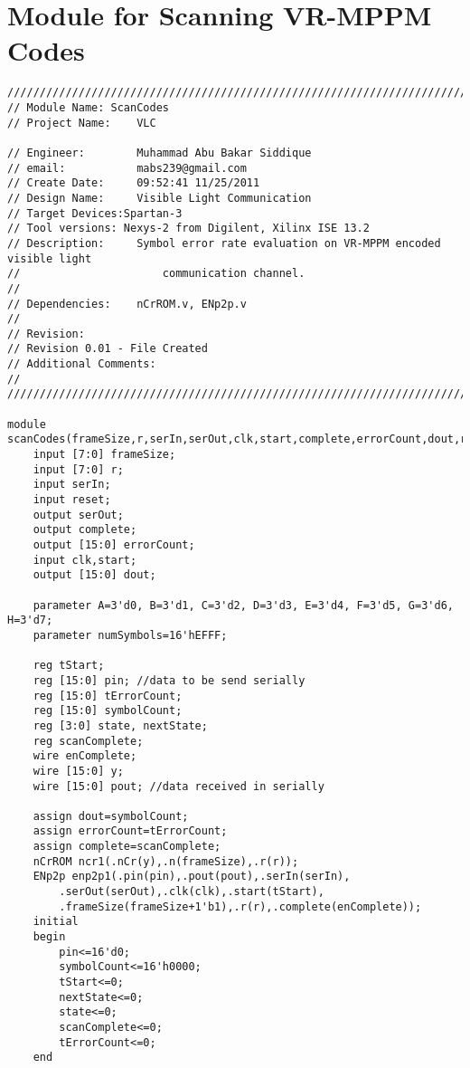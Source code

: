 \newpage
\section{Module for Scanning VR-MPPM Codes}
\label{sec:scanCodes}
\begin{lstlisting}[style=verilog-style,basicstyle=\tiny]
//////////////////////////////////////////////////////////////////////////////////
// Module Name:	ScanCodes
// Project Name: 	VLC

// Engineer: 		Muhammad Abu Bakar Siddique
// email:			mabs239@gmail.com
// Create Date:  	09:52:41 11/25/2011 
// Design Name: 	Visible Light Communication
// Target Devices:Spartan-3 
// Tool versions: Nexys-2 from Digilent, Xilinx ISE 13.2
// Description: 	Symbol error rate evaluation on VR-MPPM encoded visible light	
//						communication channel.
//
// Dependencies: 	nCrROM.v, ENp2p.v
//
// Revision: 
// Revision 0.01 - File Created
// Additional Comments: 
//
//////////////////////////////////////////////////////////////////////////////////

module scanCodes(frameSize,r,serIn,serOut,clk,start,complete,errorCount,dout,reset);
	input [7:0] frameSize;
	input [7:0] r;
	input serIn;
	input reset;
	output serOut;
	output complete;
	output [15:0] errorCount;
	input clk,start;
	output [15:0] dout;

	parameter A=3'd0, B=3'd1, C=3'd2, D=3'd3, E=3'd4, F=3'd5, G=3'd6, H=3'd7;
	parameter numSymbols=16'hEFFF;
	
	reg tStart;
	reg [15:0] pin; //data to be send serially
	reg [15:0] tErrorCount;
	reg [15:0] symbolCount;
	reg [3:0] state, nextState;
	reg scanComplete;
	wire enComplete;
	wire [15:0] y;
	wire [15:0] pout; //data received in serially

	assign dout=symbolCount;	
	assign errorCount=tErrorCount;	
	assign complete=scanComplete;	
	nCrROM ncr1(.nCr(y),.n(frameSize),.r(r));
	ENp2p enp2p1(.pin(pin),.pout(pout),.serIn(serIn),
		.serOut(serOut),.clk(clk),.start(tStart),
		.frameSize(frameSize+1'b1),.r(r),.complete(enComplete));
	initial
	begin
		pin<=16'd0;
		symbolCount<=16'h0000;
		tStart<=0;
		nextState<=0;
		state<=0;
		scanComplete<=0;
		tErrorCount<=0;
	end


\end{lstlisting}
